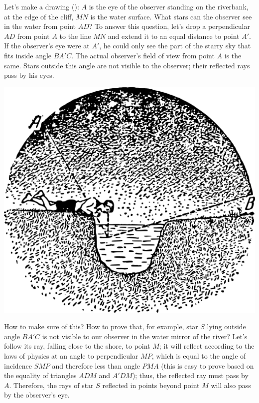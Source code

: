 Let's make a drawing (): $A$ is the eye of the observer standing on the riverbank, at the edge of the cliff, $MN$ is the water surface. What stars can the observer see in the water from point $AD$? To answer this question, let's drop a perpendicular $AD$ from point $A$ to the line $MN$ and extend it to an equal distance to point $A'$. If the observer's eye were at $A'$, he could only see the part of the starry sky that fits inside angle $BA'C$. The actual observer's field of view from point $A$ is the same. Stars outside this angle are not visible to the observer; their reflected rays pass by his eyes.

\begin{marginfigure}[0cm]%
\centering
\includegraphics[width=1.\textwidth]{figures/ch-02/fig-055.pdf}
\end{marginfigure}

How to make sure of this? How to prove that, for example, star $S$ lying outside angle $BA'C$ is not visible to our observer in the water mirror of the river? Let's follow its ray, falling close to the shore, to point $M$; it will reflect according to the laws of physics at an angle to perpendicular $MP$, which is equal to the angle of incidence $SMP$ and therefore less than angle $PMA$ (this is easy to prove based on the equality of triangles $ADM$ and $A'DM$); thus, the reflected ray must pass by $A$. Therefore, the rays of star $S$ reflected in points beyond point $M$ will also pass by the observer's eye.



